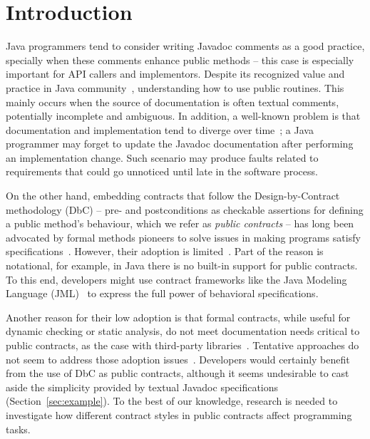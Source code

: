 \section{Introduction}
\label{sec:introduction}

Java programmers tend to consider writing Javadoc comments as a good practice,
specially when these comments enhance public methods -- this case is especially important for API callers and implementors.
Despite its recognized value and practice in Java community~\cite{liveAPI},
understanding how to use public routines.
This mainly occurs when the source of documentation is often textual comments, potentially incomplete and ambiguous. In addition, a well-known problem is that documentation and implementation tend to diverge over time~\cite{Estler-etal14}; 
a Java programmer may forget to update the Javadoc documentation after performing an implementation change. Such scenario may produce faults related to requirements that could go unnoticed until late in the software process.

On the other hand, embedding contracts that follow the Design-by-Contract methodology (DbC) -- pre- and postconditions as checkable assertions for defining a public method's behaviour, which we refer as \emph{public contracts} -- has
long been advocated by formal methods pioneers to solve issues in making programs satisfy specifications~\cite{}. 
However, their adoption is limited~\cite{Polikarpova-etal09}. 
Part of the reason is notational, for example, in Java there is no built-in support for public contracts.
To this end, developers might use contract frameworks like the Java Modeling Language (JML)~\cite{jml} to express the full power of behavioral specifications.
%
%

Another reason for their low adoption is that formal contracts, while useful for dynamic checking or static analysis, do not meet documentation needs critical to public contracts, as the case with third-party libraries~\cite{Leavens10,Parnas2011}. 
Tentative approaches do not seem to address those adoption issues~\cite{}.
Developers would certainly benefit from the use of DbC as public contracts, although it seems undesirable to cast aside the simplicity provided by textual Javadoc specifications (Section~\ref{sec:example}).
To the best of our knowledge, research is needed to investigate how different contract styles in public contracts affect programming tasks.

